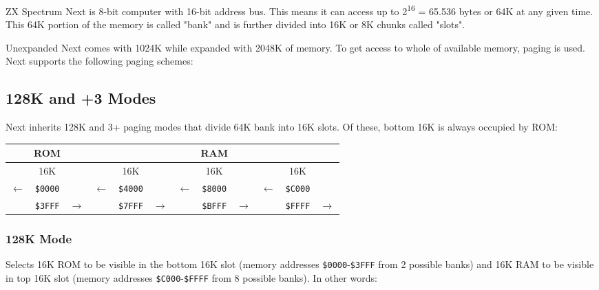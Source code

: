 \documentclass[12pt,twoside,openright,a4paper]{book}
\newcommand{\notet}{\rule{0pt}{2.4ex}}
\newcommand{\noteb}{\rule[-1.3ex]{0pt}{0pt}}
\begin{document}
\newcommand{\colnoline}[1]{\multicolumn{1}{c}{#1}}

ZX Spectrum Next is 8-bit computer with 16-bit address bus. This means it can access up to 2\textsuperscript{16} = 65.536 bytes or 64K at any given time. This 64K portion of the memory is called "bank" and is further divided into 16K or 8K chunks called "slots".

Unexpanded Next comes with 1024K while expanded with 2048K of memory. To get access to whole of available memory, paging is used. Next supports the following paging schemes:

\subsection{128K and +3 Modes}

Next inherits 128K and 3+ paging modes that divide 64K bank into 16K slots. Of these, bottom 16K is always occupied by ROM:

\begingroup
	\setlength{\tabcolsep}{1pt}
	\begin{tabular}{|ccc|ccc|ccc|ccc|}
		\hline
		\multicolumn{3}{|c}{ROM}\notet\noteb &
			\multicolumn{9}{|c|}{RAM} \\
		\hline
		\multicolumn{3}{|c}{16K}\notet\noteb &
			\multicolumn{3}{|c}{16K} &
			\multicolumn{3}{|c}{16K} &
			\multicolumn{3}{|c|}{16K} \\
		\hline
		\colnoline{$\leftarrow$}\notet & \colnoline{\tt \$0000} & \colnoline{} &
			\colnoline{$\leftarrow$} & \colnoline{\tt \$4000} & \colnoline{} &
			\colnoline{$\leftarrow$} & \colnoline{\tt \$8000} & \colnoline{} &
			\colnoline{$\leftarrow$} & \colnoline{\tt \$C000} & \colnoline{} \\
		\colnoline{} & \colnoline{\tt \$3FFF} & \colnoline{$\rightarrow$} &
			\colnoline{} & \colnoline{\tt \$7FFF} & \colnoline{$\rightarrow$} &
			\colnoline{} & \colnoline{\tt \$BFFF} & \colnoline{$\rightarrow$} &
			\colnoline{} & \colnoline{\tt \$FFFF} & \colnoline{$\rightarrow$} \\
	\end{tabular}
\endgroup

\subsubsection{128K Mode}

Selects 16K ROM to be visible in the bottom 16K slot (memory addresses {\tt \$0000}-{\tt \$3FFF} from 2 possible banks) and 16K RAM to be visible in top 16K slot (memory addresses {\tt \$C000}-{\tt \$FFFF} from 8 possible banks). In other words:
\end{document}

